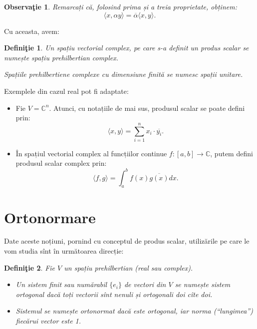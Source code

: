 \documentclass[11pt,a4paper]{article}
\newcommand\qq{\enquote}
\newcommand\CC{\mathbb{C}}
\theoremstyle{dotless}
\theoremstyle{dotlessdr}
\newtheorem{definition}{Defini\c{t}ie}[section]
\newtheorem{remark}{Observa\c{t}ie}[section]
\begin{document}
\begin{remark}\label{rk:conj}
  Remarcați că, folosind prima și a treia proprietate, obținem:
  \[
    \langle x, \alpha y \rangle = \overline{\alpha} \langle x, y \rangle.
  \]
\end{remark}

Cu aceasta, avem:

\begin{definition}\label{def:sp-unit}
  Un spațiu vectorial complex, pe care s-a definit un produs scalar se numește
  \emph{spațiu prehilbertian complex}.

  Spațiile prehilbertiene complexe cu dimensiune finită se numesc \emph{spații unitare}.
\end{definition}

Exemplele din cazul real pot fi adaptate:
\begin{itemize}
\item Fie $V = \CC^n$. Atunci, cu notațiile de mai sus, produsul scalar se
  poate defini prin:
  \[
    \langle x, y \rangle = \sum_{i = 1}^n x_i \cdot \overline{y_i}.
  \]
\item În spațiul vectorial complex al funcțiilor continue $f : [a, b] \to \CC$,
  putem defini produsul scalar complex prin:
  \[
    \langle f, g \rangle = \int_a^b f(x) \overline{g(x)} dx.
  \]
\end{itemize}


\section{Ortonormare}
\label{sec:orton}

Date aceste noțiuni, pornind cu conceptul de produs scalar, utilizările
pe care le vom studia sînt în următoarea direcție:

\begin{definition}\label{def:orton}
  Fie $V$ un spațiu prehilbertian (real sau complex).
  \begin{itemize}
  \item Un sistem finit sau numărabil $\{ e_i \}$ de vectori din $V$ se
    numește \emph{sistem ortogonal} dacă toți vectorii sînt nenuli și
    ortogonali doi cîte doi.
  \item Sistemul se numește \emph{ortonormat} dacă este ortogonal, iar
    norma (\qq{lungimea}) fiecărui vector este 1.
  \end{itemize}
\end{definition}
\end{document}
